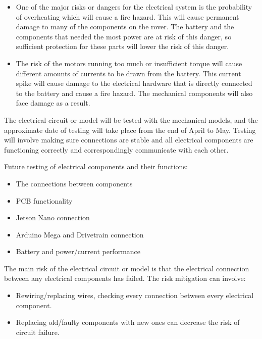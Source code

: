 \documentclass[a4paper, 10pt]{article}
\begin{document}
\begin{itemize}
\item
	One of the major risks or dangers for the electrical system is the probability of overheating which will cause a fire hazard. This will cause permanent damage to many of the components on the rover. The battery and the components that needed the most power are at risk of this danger, so sufficient protection for these parts will lower the risk of this danger.

\item
	The risk of the motors running too much or insufficient torque will cause different amounts of currents to be drawn from the battery. This current spike will cause damage to the electrical hardware that is directly connected to the battery and cause a fire hazard. The mechanical components will also face damage as a result.
\end{itemize}

The electrical circuit or model will be tested with the mechanical models, and the approximate date of testing will take place from the end of April to May. Testing will involve making sure connections are stable and all electrical components are functioning correctly and correspondingly communicate with each other. 
		
Future testing of electrical components and their functions:
\begin{itemize}
\item
The connections between components

\item
PCB functionality

\item
Jetson Nano connection

\item
Arduino Mega and Drivetrain connection

\item
Battery and power/current performance
\end{itemize}

The main risk of the electrical circuit or model is that the electrical connection between any electrical components has failed. The risk mitigation can involve:

\begin{itemize}
\item
Rewiring/replacing wires, checking every connection between every electrical component.

\item
Replacing old/faulty components with new ones can decrease the risk of circuit failure.
\end{itemize}
\end{document}
